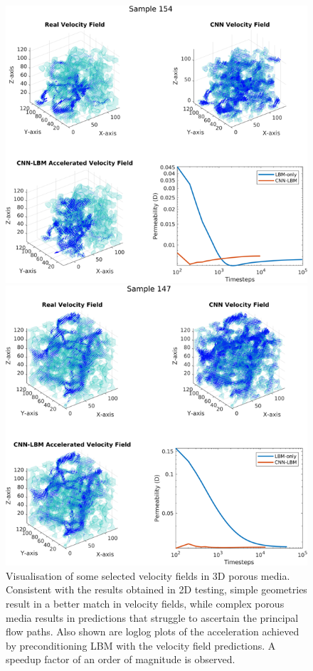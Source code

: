 \documentclass{article}
\begin{document}
\begin{figure}[htp!]
\begin{minipage}[b]{0.49\textwidth}
  \end{minipage}
    \begin{minipage}[b]{0.49\textwidth}
    \includegraphics[width=\textwidth]{figures/vel3DCompare154.png}
  \end{minipage}
  \hfill
  \begin{minipage}[b]{0.49\textwidth}
    \includegraphics[width=\textwidth]{figures/vel3DCompare147.png}
  \end{minipage}
    \caption{Visualisation of some selected velocity fields in 3D porous media. Consistent with the results obtained in 2D testing, simple geometries result in a better match in velocity fields, while complex porous media results in predictions that struggle to ascertain the principal flow paths. Also shown are loglog plots of the acceleration achieved by preconditioning LBM with the velocity field predictions. A speedup factor of an order of magnitude is observed.}
    \label{fig:velAccelerate3d}
\end{figure}
\end{document}
